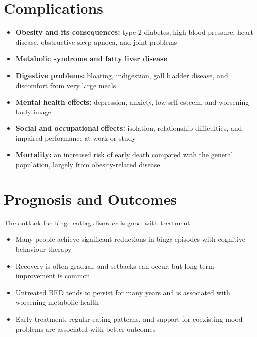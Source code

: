 \section*{Complications}
\begin{itemize}
    \item \textbf{Obesity and its consequences:} type 2 diabetes, high blood pressure, heart disease, obstructive sleep apnoea, and joint problems
    \item \textbf{Metabolic syndrome and fatty liver disease}
    \item \textbf{Digestive problems:} bloating, indigestion, gall bladder disease, and discomfort from very large meals
    \item \textbf{Mental health effects:} depression, anxiety, low self-esteem, and worsening body image
    \item \textbf{Social and occupational effects:} isolation, relationship difficulties, and impaired performance at work or study
    \item \textbf{Mortality:} an increased risk of early death compared with the general population, largely from obesity-related disease
\end{itemize}

\section*{Prognosis and Outcomes}
The outlook for binge eating disorder is good with treatment.

\begin{itemize}
    \item Many people achieve significant reductions in binge episodes with cognitive behaviour therapy
    \item Recovery is often gradual, and setbacks can occur, but long-term improvement is common
    \item Untreated BED tends to persist for many years and is associated with worsening metabolic health
    \item Early treatment, regular eating patterns, and support for coexisting mood problems are associated with better outcomes
\end{itemize}

